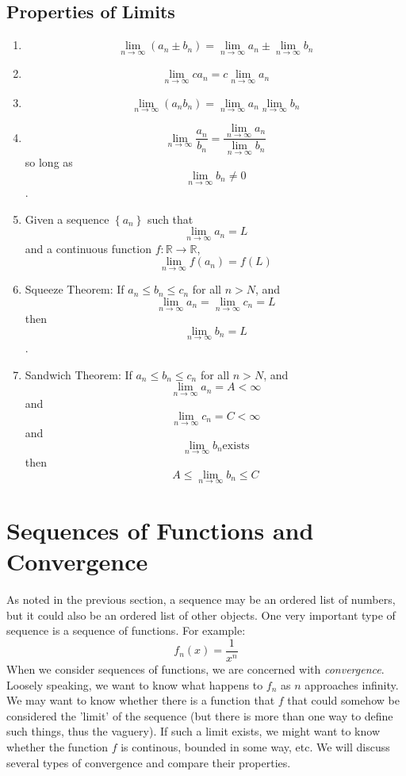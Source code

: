\documentclass[12pt,a4paper]{article} %
\begin{document}
\subsection{Properties of Limits}
\begin{enumerate}
\item $$\lim_{n\rightarrow\infty}\left(a_n\pm b_n\right) = \lim_{n\rightarrow\infty} a_n \pm \lim_{n\rightarrow\infty} b_n$$
\item $$\lim_{n\rightarrow\infty}c a_n = c \lim_{n\rightarrow\infty} a_n$$
\item $$\lim_{n\rightarrow\infty}\left(a_n b_n\right) = \lim_{n\rightarrow\infty} a_n \lim_{n\rightarrow\infty} b_n$$
\item $$\lim_{n\rightarrow\infty}\frac{a_n}{b_n} = \frac{\lim_{n\rightarrow\infty} a_n}{ \lim_{n\rightarrow\infty} b_n}$$ so long as $$\lim_{n\rightarrow\infty}b_n\neq 0$$.
\item Given a sequence $\left\{a_n\right\}$ such that $$\lim_{n\rightarrow\infty} a_n = L$$ and a continuous function $f:\mathbb{R}\rightarrow\mathbb{R}$, $$\lim_{n\rightarrow\infty} f(a_n) = f(L)$$
\item Squeeze Theorem:  If $a_n\leq b_n\leq c_n$ for all $n>N$, and $$\lim_{n\rightarrow\infty}a_n = \lim_{n\rightarrow\infty} c_n = L$$ then $$\lim_{n\rightarrow\infty}b_n = L$$.
\item Sandwich Theorem:  If $a_n\leq b_n\leq c_n$ for all $n>N$, and $$\lim_{n\rightarrow\infty}a_n = A<\infty$$  and $$ \lim_{n\rightarrow\infty} c_n = C<\infty$$ and $$\lim_{n\rightarrow\infty}b_n  \mathrm{exists}$$ then  $$A\leq\lim_{n\rightarrow\infty}b_n\leq C$$
\end{enumerate}
\section{Sequences of Functions and Convergence}
As noted in the previous section, a sequence may be an ordered list of numbers, but it could also be an ordered list of other objects.  One very important type of sequence is a sequence of functions.  For example:
$$f_n(x) = \frac{1}{x^n}$$
When we consider sequences of functions, we are concerned with \emph{convergence}.  Loosely speaking, we want to know what happens to $f_n$ as $n$ approaches infinity.  We may want to know whether there is a function that $f$ that could somehow be considered the 'limit' of the sequence (but there is more than one way to define such things, thus the vaguery).  If such a limit exists, we might want to know whether the function $f$ is continous, bounded in some way, etc. We will discuss several types of convergence and compare their properties.
\end{document}
